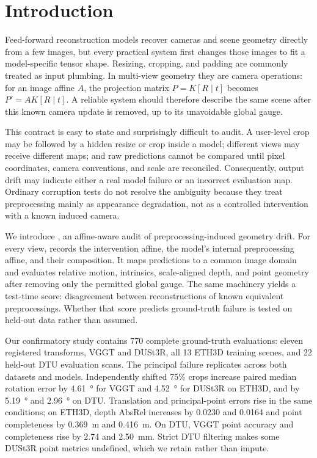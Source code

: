 \section{Introduction}
\label{sec:introduction}

Feed-forward reconstruction models recover cameras and scene geometry directly
from a few images, but every practical system first changes those images to fit
a model-specific tensor shape.  Resizing, cropping, and padding are commonly
treated as input plumbing.  In multi-view geometry they are camera operations:
for an image affine $A$, the projection matrix $P=K[R\mid t]$ becomes
$P'=AK[R\mid t]$.  A reliable system should therefore describe the same scene
after this known camera update is removed, up to its unavoidable global gauge.

This contract is easy to state and surprisingly difficult to audit.  A
user-level crop may be followed by a hidden resize or crop inside a model;
different views may receive different maps; and raw predictions cannot be
compared until pixel coordinates, camera conventions, and scale are reconciled.
Consequently, output drift may indicate either a real model failure or an
incorrect evaluation map.  Ordinary corruption tests do not resolve the
ambiguity because they treat preprocessing mainly as appearance degradation,
not as a controlled intervention with a known induced camera.

We introduce \method, an affine-aware audit of preprocessing-induced geometry
drift.  For every view, \method records the intervention affine, the model's
internal preprocessing affine, and their composition.  It maps predictions to
a common image domain and evaluates relative motion, intrinsics, scale-aligned
depth, and point geometry after removing only the permitted global gauge.  The
same machinery yields a test-time score: disagreement between reconstructions
of known equivalent preprocessings.  Whether that score predicts ground-truth
failure is tested on held-out data rather than assumed.

Our confirmatory study contains 770 complete ground-truth evaluations: eleven
registered transforms, VGGT and DUSt3R, all 13 ETH3D training scenes, and 22
held-out DTU evaluation scans.  The principal failure replicates across both
datasets and models.  Independently shifted 75\% crops increase paired median
rotation error by \SI{4.61}{\degree} for VGGT and \SI{4.52}{\degree} for
DUSt3R on ETH3D, and by \SI{5.19}{\degree} and \SI{2.96}{\degree} on DTU.
Translation and principal-point errors rise in the same conditions; on ETH3D,
depth AbsRel increases by 0.0230 and 0.0164 and point completeness by
\SI{0.369}{\meter} and \SI{0.416}{\meter}.  On DTU, VGGT point accuracy and
completeness rise by 2.74 and \SI{2.50}{\milli\meter}.  Strict DTU filtering
makes some DUSt3R point metrics undefined, which we retain rather than impute.

